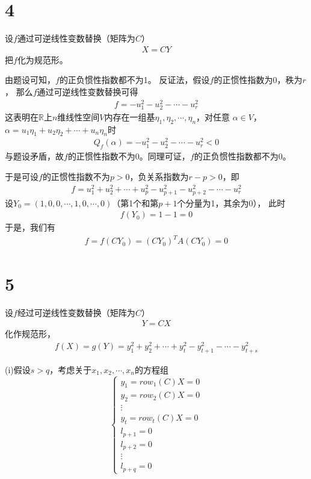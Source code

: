 \documentclass{article}
\begin{document}
\section*{4}
设$f$通过可逆线性变数替换（矩阵为$C$）
\begin{align*}
  X = C Y
\end{align*}
把$f$化为规范形。

由题设可知，$f$的正负惯性指数都不为1。
反证法，假设$f$的正惯性指数为0，秩为$r$，
那么$f$通过可逆线性变数替换可得
\begin{align*}
  f = - u_1^2 - u_2^2 - \cdots - u_r^2
\end{align*}
这表明在$\mathbb{R}$上$n$维线性空间$V$内存在一组基$\eta_1, \eta_2, \cdots, \eta_n$，对任意
$\alpha \in V$，$\alpha = u_1 \eta_1 + u_2 \eta_2 + \cdots + u_n \eta_n$时
\begin{align*}
  Q_f(\alpha) = - u_1^2 - u_2^2 - \cdots - u_r^2 < 0
\end{align*}
与题设矛盾，故$f$的正惯性指数不为0。同理可证，$f$的正负惯性指数都不为0。

于是可设$f$的正惯性指数不为$p > 0$，负关系指数为$r - p > 0$，即
\begin{align*}
  f = u_1^2 + u_2^2 + \cdots + u_p^2 - u_{p+1}^2 - u_{p+2}^2 - \cdots - u_r^2
\end{align*}
设$Y_0 = (1, 0, 0, \cdots, 1, 0, \cdots, 0)$（第1个和第$p+1$个分量为1，其余为0），
此时
\begin{align*}
  f(Y_0) = 1 - 1 = 0
\end{align*}
于是，我们有
\begin{align*}
  f = f(CY_0) = (CY_0)^T A (CY_0) = 0
\end{align*}

\section*{5}

设$f$经过可逆线性变数替换（矩阵为$C$）
\begin{align*}
  Y = C X
\end{align*}
化作规范形，
\begin{align*}
  f(X) = g(Y) = y_1^2 + y_2^2 + \cdots + y_t^2 - y_{t+1}^2 - \cdots - y_{t+s}^2
\end{align*}

(i)假设$s > q$，考虑关于$x_1, x_2, \cdots, x_n$的方程组
\begin{equation*}
  \begin{cases}
    y_1 = row_{1}(C) X = 0 \\
    y_2 = row_{2}(C) X = 0 \\
    \vdots                 \\
    y_t = row_{t}(C) X = 0 \\
    l_{p+1} = 0            \\
    l_{p+2} = 0            \\
    \vdots                 \\
    l_{p+q} = 0
  \end{cases}
\end{equation*}
\end{document}
